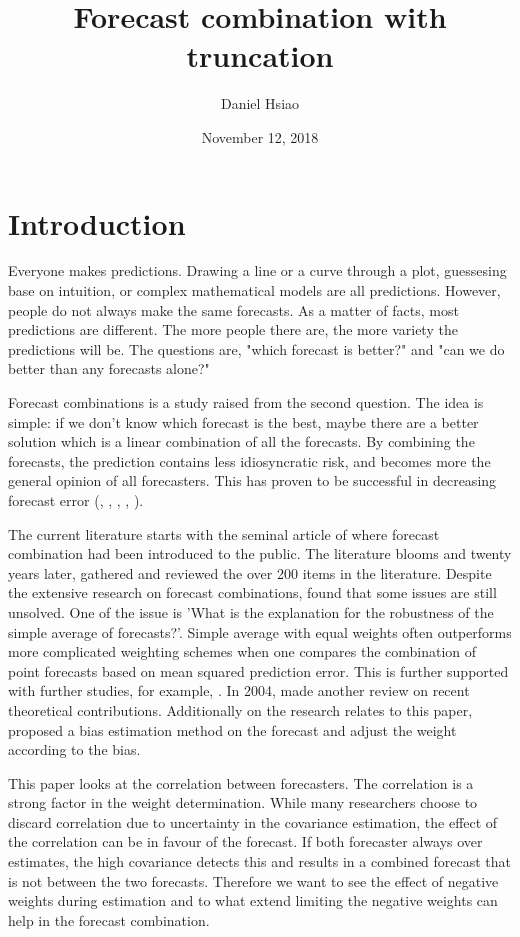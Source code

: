 \documentclass[11pt]{article}
\title{Forecast combination with truncation}
\author{Daniel Hsiao}
\date{November 12, 2018}
\begin{document}
\maketitle
\newpage
{
	\setcounter{tocdepth}{3}
	\tableofcontents
}
\newpage

\section{Introduction}\label{introduction}
Everyone makes predictions. Drawing a line or a curve through a plot, guessesing base on intuition, or complex mathematical models are all predictions. However, people do not always make the same forecasts. As a matter of facts, most predictions are different. The more people there are, the more variety the predictions will be. The questions are, "which forecast is better?" and "can we do better than any forecasts alone?"

Forecast combinations is a study raised from the second question. The idea is simple: if we don't know which forecast is the best, maybe there are a better solution which is a linear combination of all the forecasts. By combining the forecasts, the prediction contains less idiosyncratic risk, and becomes more the general opinion of all forecasters. This has proven to be successful in decreasing forecast error (\cite{Clemen1989}, \cite{Diebold1996}, \cite{Chen1999} , \cite{Dunis2000}, \cite{Stock2004}).

The current literature starts with the seminal article of \cite{Bates1969} where forecast combination had been introduced to the public. The literature blooms and twenty years later, \cite{Clemen1989} gathered and reviewed the over 200 items in the literature. Despite the extensive research on forecast combinations, \citeauthor{Clemen1989} found that some issues are still unsolved. One of the issue is 'What is the explanation for the robustness of the simple average of forecasts?'. Simple average with equal weights often outperforms more complicated weighting schemes when one compares the combination of point forecasts based on mean squared prediction error. This is further supported with further studies, for example, \citep{Stock2004}. In 2004, \citeauthor{Elliot2004} made another review on recent theoretical contributions. Additionally on the research relates to this paper, \cite{Gibbs2017} proposed a bias estimation method on the forecast and adjust the weight according to the bias.

This paper looks at the correlation between forecasters. The correlation is a strong factor in the weight determination. While many researchers choose to discard correlation due to uncertainty in the covariance estimation, the effect of the correlation can be in favour of the forecast. If both forecaster always over estimates, the high covariance detects this and results in a combined forecast that is not between the two forecasts. Therefore we want to see the effect of negative weights during estimation and to what extend limiting the negative weights can help in the forecast combination.
\end{document}
